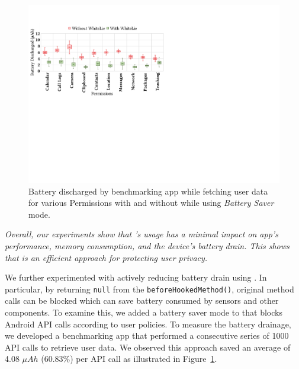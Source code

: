 \begin{figure}[b!]
    \centering
    \includegraphics[width=0.8\linewidth]{Figures/Performance Evaluation/results_battery_discharged_battery_saver.pdf}
    \caption{Battery discharged by benchmarking app while fetching user data for various Permissions with and without \framework{} while using \textit{Battery Saver} mode.}
    \label{fig:reslts_btrySaver}
\end{figure}

  

\textit{Overall, our experiments show that \framework{}'s usage has a minimal impact on app's performance, memory consumption, and the device's battery drain. This shows that \framework{} is an efficient approach for protecting user privacy.}

We further experimented with actively reducing battery drain using \framework{}. In particular, by returning \texttt{null} from the \texttt{beforeHookedMethod()}, original method calls can be blocked which can save battery consumed by sensors and other components. To examine this, we added a battery saver mode to \framework{} that blocks Android API calls according to user policies. To measure the battery drainage, we developed a benchmarking app that performed a consecutive series of 1000 API calls to retrieve user data. We observed this approach saved an average of 4.08 $\mu{}Ah$ (60.83\%) per API call as illustrated in Figure~\ref{fig:reslts_btrySaver}.
